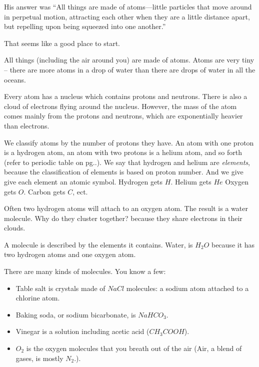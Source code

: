 His answer was ``All things are made of atoms—little particles that move around in
perpetual motion, attracting each other when they are a little
distance apart, but repelling upon being squeezed into one another.''

That seems like a good place to start.

All things (including the air around you) are made of atoms. Atoms are
very tiny -- there are more atoms in a drop of water than there are
drops of water in all the oceans.

Every atom has a nucleus which contains protons and neutrons. There is also
a cloud of electrons flying around the nucleus. However, the mass of the atom
comes mainly from the protons and neutrons, which are exponentially heavier
than electrons.  

We classify atoms by the number of protons they have. An atom with one proton is a
hydrogen atom, an atom with two protons is a helium atom, and so forth (refer to periodic table on pg..). We say that hydrogen and helium are
\textit{elements}, because the classification of elements is based on proton number. And we give
give each element an atomic symbol. Hydrogen gets $H$. Helium gets $He$ Oxygen gets
$O$. Carbon gets $C$, ect.

Often two hydrogen atoms will attach to an oxygen atom.  The result is
a water molecule. Why do they cluster together? because they share 
electrons in their clouds.

A molecule is described by the elements it contains.  Water, is $H_2O$ because it has two hydrogen atoms and one oxygen
atom.

There are many kinds of molecules. You know a few:
\begin{itemize}
\item Table salt is crystals made of $NaCl$ molecules: a sodium atom attached to a chlorine atom.
\item Baking soda, or sodium bicarbonate, is $NaHCO_3$.
\item Vinegar is a solution including acetic acid ($CH_3COOH$).
\item $O_2$ is the oxygen molecules that you breath out of the air (Air, a blend of gases, is mostly $N_2$.).
\end{itemize}


